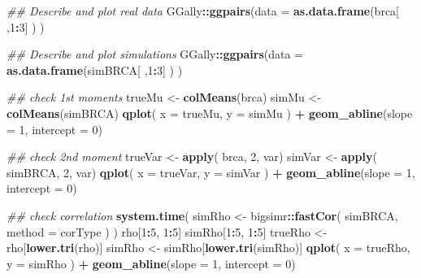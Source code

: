 \documentclass[
]{article}
\newenvironment{Shaded}{\begin{snugshade}}{\end{snugshade}}
\newcommand{\CommentTok}[1]{\textcolor[rgb]{0.56,0.35,0.01}{\textit{#1}}}
\newcommand{\DataTypeTok}[1]{\textcolor[rgb]{0.13,0.29,0.53}{#1}}
\newcommand{\DecValTok}[1]{\textcolor[rgb]{0.00,0.00,0.81}{#1}}
\newcommand{\KeywordTok}[1]{\textcolor[rgb]{0.13,0.29,0.53}{\textbf{#1}}}
\newcommand{\NormalTok}[1]{#1}
\newcommand{\OperatorTok}[1]{\textcolor[rgb]{0.81,0.36,0.00}{\textbf{#1}}}
\newcommand{\StringTok}[1]{\textcolor[rgb]{0.31,0.60,0.02}{#1}}
\begin{document}
\begin{Shaded}
\begin{Highlighting}[]

\CommentTok{\#\# Describe and plot real data}
\NormalTok{GGally}\OperatorTok{::}\KeywordTok{ggpairs}\NormalTok{(}\DataTypeTok{data =} \KeywordTok{as.data.frame}\NormalTok{(brca[ ,}\DecValTok{1}\OperatorTok{:}\DecValTok{3}\NormalTok{] ) )}

\CommentTok{\#\# Describe and plot simulations}
\NormalTok{GGally}\OperatorTok{::}\KeywordTok{ggpairs}\NormalTok{(}\DataTypeTok{data =} \KeywordTok{as.data.frame}\NormalTok{(simBRCA[ ,}\DecValTok{1}\OperatorTok{:}\DecValTok{3}\NormalTok{] ) )}

\CommentTok{\#\# check 1st moments}
\NormalTok{trueMu \textless{}{-}}\StringTok{ }\KeywordTok{colMeans}\NormalTok{(brca)}
\NormalTok{simMu \textless{}{-}}\StringTok{ }\KeywordTok{colMeans}\NormalTok{(simBRCA)}
\KeywordTok{qplot}\NormalTok{( }\DataTypeTok{x =}\NormalTok{ trueMu, }\DataTypeTok{y =}\NormalTok{ simMu ) }\OperatorTok{+}\StringTok{ }\KeywordTok{geom\_abline}\NormalTok{(}\DataTypeTok{slope =} \DecValTok{1}\NormalTok{, }\DataTypeTok{intercept =} \DecValTok{0}\NormalTok{)}

\CommentTok{\#\# check 2nd moment}
\NormalTok{trueVar \textless{}{-}}\StringTok{ }\KeywordTok{apply}\NormalTok{( brca, }\DecValTok{2}\NormalTok{, var)}
\NormalTok{simVar \textless{}{-}}\StringTok{ }\KeywordTok{apply}\NormalTok{( simBRCA, }\DecValTok{2}\NormalTok{, var)}
\KeywordTok{qplot}\NormalTok{( }\DataTypeTok{x =}\NormalTok{ trueVar, }\DataTypeTok{y =}\NormalTok{ simVar ) }\OperatorTok{+}\StringTok{ }\KeywordTok{geom\_abline}\NormalTok{(}\DataTypeTok{slope =} \DecValTok{1}\NormalTok{, }\DataTypeTok{intercept =} \DecValTok{0}\NormalTok{)}

\CommentTok{\#\# check correlation}
\KeywordTok{system.time}\NormalTok{( simRho \textless{}{-}}\StringTok{ }\NormalTok{bigsimr}\OperatorTok{::}\KeywordTok{fastCor}\NormalTok{( simBRCA, }\DataTypeTok{method =}\NormalTok{ corType ) )}
\NormalTok{rho[}\DecValTok{1}\OperatorTok{:}\DecValTok{5}\NormalTok{, }\DecValTok{1}\OperatorTok{:}\DecValTok{5}\NormalTok{]}
\NormalTok{simRho[}\DecValTok{1}\OperatorTok{:}\DecValTok{5}\NormalTok{, }\DecValTok{1}\OperatorTok{:}\DecValTok{5}\NormalTok{]}
\NormalTok{trueRho \textless{}{-}}\StringTok{ }\NormalTok{rho[}\KeywordTok{lower.tri}\NormalTok{(rho)]}
\NormalTok{simRho \textless{}{-}}\StringTok{ }\NormalTok{simRho[}\KeywordTok{lower.tri}\NormalTok{(simRho)]}
\KeywordTok{qplot}\NormalTok{( }\DataTypeTok{x =}\NormalTok{ trueRho, }\DataTypeTok{y =}\NormalTok{ simRho ) }\OperatorTok{+}\StringTok{ }\KeywordTok{geom\_abline}\NormalTok{(}\DataTypeTok{slope =} \DecValTok{1}\NormalTok{, }\DataTypeTok{intercept =} \DecValTok{0}\NormalTok{)}
\end{Highlighting}
\end{Shaded}
\end{document}
